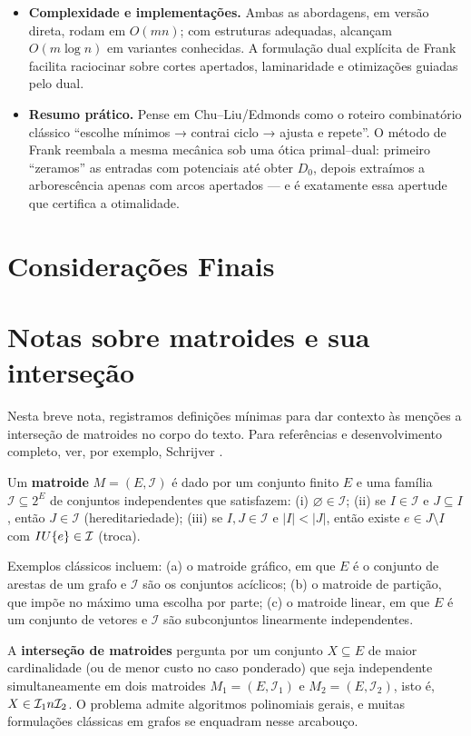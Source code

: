 \documentclass[12pt,a4paper]{article}
\def\emph#1{#1}%
\def\cup{\string U}%
\def\cap{\string n}%
\begin{document}
\begin{itemize}
    \item \textbf{Complexidade e implementações.} Ambas as abordagens, em versão direta, rodam em \(O(mn)\); com estruturas adequadas, alcançam \(O(m\log n)\) em variantes conhecidas. A formulação dual explícita de \emph{Frank} facilita raciocinar sobre \emph{cortes apertados}, laminaridade e otimizações guiadas pelo dual.
    \item \textbf{Resumo prático.} Pense em \emph{Chu–Liu/Edmonds} como o roteiro combinatório clássico “escolhe mínimos → contrai ciclo → ajusta e repete”. O método de \emph{Frank} reembala a mesma mecânica sob uma ótica \emph{primal–dual}: primeiro “zeramos” as entradas com potenciais até obter \(D_0\), depois extraímos a arborescência apenas com arcos apertados — e é exatamente essa apertude que certifica a otimalidade.
\end{itemize}

\section{Considerações Finais}
\clearpage
\appendix

\section{Notas sobre matroides e sua interseção}
\label{ap:matroides}
Nesta breve nota, registramos definições mínimas para dar contexto às menções a interseção de matroides no corpo do texto. Para referências e desenvolvimento completo, ver, por exemplo, Schrijver \cite{schrijver2003comb}.

Um \textbf{matroide} $M=(E,\mathcal{I})$ é dado por um conjunto finito $E$ e uma família $\mathcal{I}\subseteq 2^{E}$ de conjuntos \emph{independentes} que satisfazem: (i) $\varnothing\in\mathcal{I}$; (ii) se $I\in\mathcal{I}$ e $J\subseteq I$, então $J\in\mathcal{I}$ (hereditariedade); (iii) se $I,J\in\mathcal{I}$ e $|I|<|J|$, então existe $e\in J\setminus I$ com $I\cup\{e\}\in\mathcal{I}$ (troca).

Exemplos clássicos incluem: (a) o matroide gráfico, em que $E$ é o conjunto de arestas de um grafo e $\mathcal{I}$ são os conjuntos acíclicos; (b) o matroide de partição, que impõe no máximo uma escolha por parte; (c) o matroide linear, em que $E$ é um conjunto de vetores e $\mathcal{I}$ são subconjuntos linearmente independentes.

A \textbf{interseção de matroides} pergunta por um conjunto $X\subseteq E$ de maior cardinalidade (ou de menor custo no caso ponderado) que seja independente simultaneamente em dois matroides $M_1=(E,\mathcal{I}_1)$ e $M_2=(E,\mathcal{I}_2)$, isto é, $X\in\mathcal{I}_1\cap\mathcal{I}_2$. O problema admite algoritmos polinomiais gerais, e muitas formulações clássicas em grafos se enquadram nesse arcabouço.
\end{document}
